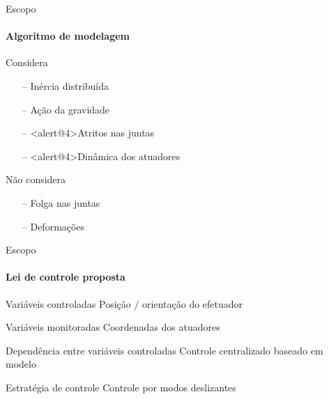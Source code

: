 \documentclass[25pt,landscape]{beamer}
\begin{document}
\begin{frame}{Escopo}
    \framesubtitle{Algoritmo de modelagem}
    \pause
    \begin{block}{Considera}
        \pause
        \begin{itemize}
            \item[--] In\'ercia distribu\'ida \\[6pt]
            \item[--] A\c{c}\~ao da gravidade \\[6pt]
            \item[--] <alert@4>Atritos nas juntas \\[6pt]
            \item[--] <alert@4>Din\^amica dos atuadores \\[6pt]
        \end{itemize}
    \end{block}
    \pause
    \pause
    \begin{block}{N\~ao considera}
        \pause
        \begin{itemize}
            \item[--] Folga nas juntas \\[6pt]
            \item[--] Deforma\c{c}\~oes \\[6pt]
        \end{itemize}
    \end{block}
\end{frame}

\begin{frame}{Escopo}
    \framesubtitle{Lei de controle proposta}
    \pause
    \begin{block}{Vari\'aveis controladas}
    	Posi\c{c}\~ao / orienta\c{c}\~ao do efetuador
    \end{block}
    \pause
    \begin{block}{Vari\'aveis monitoradas}
    	Coordenadas dos atuadores
    \end{block}
    \pause
    \begin{block}{Depend\^encia entre vari\'aveis controladas}
    	Controle centralizado baseado em modelo
    \end{block}
    \pause
   	\begin{block}{Estrat\'egia de controle}
    	Controle por modos deslizantes
    \end{block}
\end{frame}
\end{document}
